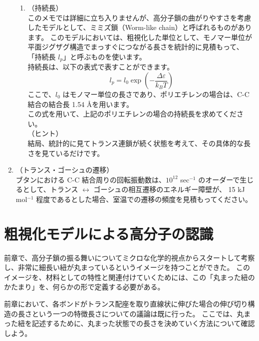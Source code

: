 \documentclass[uplatex,dvipdfmx,a4paper,11pt, titlepage]{jsarticle}
\begin{document}
\begin{enumerate}
\begin{enumerate}
			\item
			\label{it:2-5}
			（持続長）\\
			このメモでは詳細に立ち入りませんが、高分子鎖の曲がりやすさを考慮したモデルとして、ミミズ鎖（Worm-like chain）と呼ばれるものがあります。
			このモデルにおいては、粗視化した単位として、モノマー単位が平面ジグザグ構造でまっすぐにつながる長さを統計的に見積もって、
			「持続長 $l_p$」と呼ぶものを使います。\\
			持続長は、以下の表式で表すことができます。
			\begin{equation*}
			l_p = l_0 \exp \left( - \dfrac{\Delta \varepsilon}{k_B T} \right)
			\end{equation*}
			ここで、$l_0$ はモノマー単位の長さであり、ポリエチレンの場合は、C-C 結合の結合長 1.54 \AA を用います。\\
			この式を用いて、上記のポリエチレンの場合の持続長を求めてください。\\
			（ヒント）\\
			結局、統計的に見てトランス連鎖が続く状態を考えて、その具体的な長さを見ているだけです。
	\end{enumerate}
	\item
	\label{it:2-6}
	（トランス・ゴーシュの遷移）\\
	ブタンにおける C-C 結合周りの回転振動数は、$10^{12}$ sec$^{-1}$ のオーダーで生じるとして、トランス $\leftrightarrow$ ゴーシュの相互遷移のエネルギー障壁が、
	15 kJ mol$^{-1}$ 程度であるとした場合、室温での遷移の頻度を見積もってください。
\end{enumerate}

\newpage

\section{粗視化モデルによる高分子の認識}
\label{sec:CG_model}

前章で、高分子鎖の振る舞いについてミクロな化学的視点からスタートして考察し、非常に細長い紐が丸まっているというイメージを持つことができた。
このイメージを、材料としての特性と関連付けていくためには、この「丸まった紐のかたまり」を、何らかの形で定義する必要がある。

前章において、各ボンドがトランス配座を取り直線状に伸びた場合の伸び切り構造の長さという一つの特徴長さについての議論は既に行った。
ここでは、丸まった紐を記述するために、丸まった状態での長さを決めていく方法について確認しよう。
\end{document}
